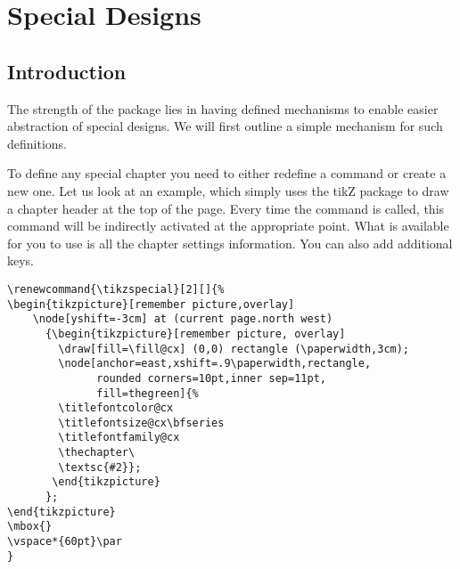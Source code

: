 \@specialtrue

\chapter{Special Designs}
\section{Introduction}

The strength of the package lies in having defined mechanisms to enable easier abstraction of special designs.
We will first outline a simple mechanism for such definitions.

To define any special chapter you need to either redefine a command or create a new one. Let us look at
an example, which simply uses the tikZ package to draw a chapter header at the top of the page. Every time the  command is called, this command will be indirectly activated at the appropriate point.
What is available for you to use is all the chapter settings information. You can also add additional keys.

\begin{tcolorbox}
\begin{lstlisting}
\renewcommand{\tikzspecial}[2][]{%
\begin{tikzpicture}[remember picture,overlay]
    \node[yshift=-3cm] at (current page.north west)
      {\begin{tikzpicture}[remember picture, overlay]
        \draw[fill=\fill@cx] (0,0) rectangle (\paperwidth,3cm);
        \node[anchor=east,xshift=.9\paperwidth,rectangle,
              rounded corners=10pt,inner sep=11pt,
              fill=thegreen]{%
        \titlefontcolor@cx
        \titlefontsize@cx\bfseries
        \titlefontfamily@cx
        \thechapter\
        \textsc{#2}};
       \end{tikzpicture}
      };
\end{tikzpicture}
\mbox{}
\vspace*{60pt}\par
}
\end{lstlisting}
\end{tcolorbox}


